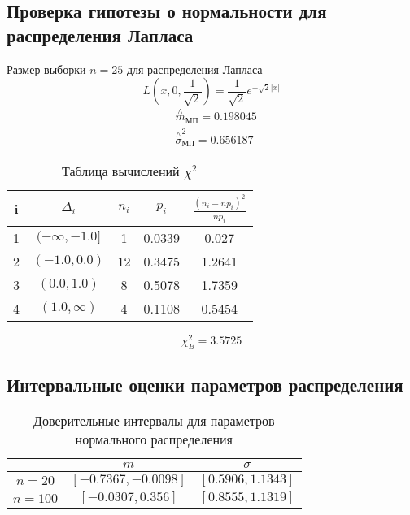 \documentclass[a4]{article}
\begin{document}
\subsection{Проверка гипотезы о нормальности для распределения \newline  Лапласа}
Размер выборки $ n = 25 $ для распределения Лапласа
\begin{equation}\label{eqn:laplace}
L\left( x,0,\frac{1}{\sqrt{2}}\right) = \frac{1}{\sqrt{2}}e^{-\sqrt{2}\vert x\vert}
\end{equation}
\begin{equation}
\begin{split}
&\overset{\wedge}{m}_{\text{МП}} = 0.198045\\
&  \overset{\wedge}{\sigma}^2_{\text{МП}} = 0.656187
\end{split}
\end{equation}

\begin{table}[H]
	\caption{Таблица вычислений $\chi^2$}
	\label{tab:my_label1}
	\begin{center}
		\vspace{5mm}
		\begin{tabular}{|c|c|c|c|c|}
			\hline
			i & $\Delta_i$ & $n_i$ & $p_i$ & $\frac{(n_i-np_i)^2}{np_i}$\\
			\hline
			1&	 $(-\infty, -1.0]$ &	1  &	 0.0339 &	 0.027\\
			\hline
			2&	$(-1.0, 0.0)$&	12&	 0.3475&	  1.2641\\
			\hline
			3& $(0.0, 1.0)$&	8&	 0.5078&	 1.7359\\
			\hline
			4&	$(1.0, \infty)$&	4&	 0.1108&	 0.5454\\
			\hline
			
			\hline
		\end{tabular}
	\end{center}
\end{table}

$$\chi_B^2 = 3.5725$$ 

\subsection{Интервальные оценки параметров распределения}

\begin{table}[H]
	\caption{Доверительные интервалы для параметров нормального распределения}
	\label{tab:my_label1}
	\begin{center}
		\vspace{5mm}
		\begin{tabular}{|c|c|c|}
			\hline
			& $m$ & $\sigma$\\
			\hline
			$ n = 20 $ &	 $[-0.7367, -0.0098]$ &	$ [0.5906, 1.1343] $\\
			\hline
			$ n = 100 $&	$[-0.0307, 0.356]$ & $ [0.8555, 1.1319] $\\
			\hline
		\end{tabular}
	\end{center}
\end{table}
\end{document}
